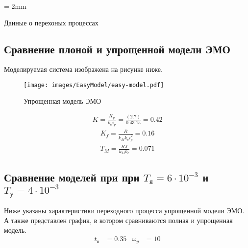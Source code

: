 \documentclass[a4paper, 12pt]{article}
\begin{document}
\begin{table}[h!]
   \tabulinesep = 2mm
   \centering
   \begin{threeparttable}
        \caption{Данные о перехоных процессах }
            \end{threeparttable}          
\end{table}

\newpage
\begin{center}
\section{Сравнение плоной и упрощенной модели ЭМО}
\end{center}
\par Моделируемая система изображена на рисунке ниже.

\begin{figure}[h!]
    \centering
    \texttt{[image: images/EasyModel/easy-model.pdf]}
    \caption{Упрощенная модель ЭМО}
\end{figure}
\begin{align}
K = \frac{K_y}{k_e i_p}=\frac{(2.7)}{0.43.15}=0.42
\end{align}
\begin{align}
K_f = \frac{R}{k_M k_e i_p^2}=0.16
\end{align}
\begin{align}
T_M = \frac{RJ}{k_M k_e}=0.071
\end{align}
\subsection{Сравнение моделей при при $T_\text{я} = 6\cdot10^{-3}$ и $T_\text{у} = 4\cdot10^{-3}$}
Ниже указаны характеристики переходного процесса упрощенной модели ЭМО. А также представлен график, в котором сравниваются полная и упрощенная модель.
\begin{align*}
    t_\text{п} & = 0.35 & \omega_y & = 10 \\
\end{align*}
\end{document}
